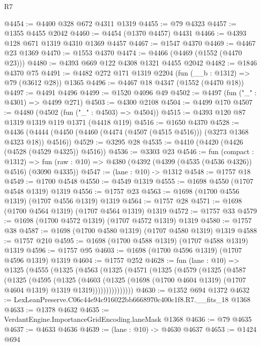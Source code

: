 \begin{lexlean}{R7}
\begin{coremodule}
@4454 := @4400 @328 @672 @4311 @1319
@4455 := @79 @4323
@4457 := @1355 @4455 @2042
@4460 := @4454 (@1370 @4457) @4431
@4466 := @4393 @128 @671 @1319 @4310 @1369 @4457
@4467 := @1547 @4370
@4469 := @4467 @23 @1369
@4470 := @1553 @4370
@4474 := @4466 (@4469 (@1552 (@4470 @23)))
@4480 := @4393 @669 @122 @4308 @1321 @4455 @2042
@4482 := @1846 @4370 @75
@4491 := @4482 @272 @171 @1319 @2204 (fun (__b : @1312) => @79 (@3612 @28)) @1365
@4496 := @4467 @18 @4347 (@1552 (@4470 @18))
@4497 := @4491 @4496
@4499 := @1520 @4096 @49
@4502 := @4497 (fun ("_" : @4301) => @4499 @271)
@4503 := @4300 @2108
@4504 := @4499 @170
@4507 := @4480 (@4502 (fun ("_" : @4503) => @4504))
@4515 := @4393 @120 @87 @1319 @1319 @119 @1371 (@4418 @119)
@4516 := @1650 @4370
@4528 := @4436 (@4444 (@4450 (@4460 (@4474 (@4507 (@4515 @4516))) (@3273 @1368 @4323 @18)) @4516))
@4529 := @3295 @28
@4535 := @4410 (@4420 (@4426 (@4528 (@4529 @4325)) @4516))
@4536 := @3303 @23
@4546 := fun (compact : @1312) =>
  fun (raw : @10) => @4380 (@4392 (@4399 (@4535 (@4536 @4326)) @4516) (@3090 @4335))
@4547 := (lane : @10) -> @1312
@4548 := @1757 @18
@4549 := @1700 @4548
@4550 := @4549 @1319
@4555 := @1698 @4550 (@1707 @4548 @1319) @1319
@4556 := @1757 @23
@4563 := @1698 (@1700 @4556 @1319) (@1707 @4556 @1319) @1319
@4564 := @1757 @28
@4571 := @1698 (@1700 @4564 @1319) (@1707 @4564 @1319) @1319
@4572 := @1757 @33
@4579 := @1698 (@1700 @4572 @1319) (@1707 @4572 @1319) @1319
@4580 := @1757 @38
@4587 := @1698 (@1700 @4580 @1319) (@1707 @4580 @1319) @1319
@4588 := @1757 @210
@4595 := @1698 (@1700 @4588 @1319) (@1707 @4588 @1319) @1319
@4596 := @1757 @95
@4603 := @1698 (@1700 @4596 @1319) (@1707 @4596 @1319) @1319
@4604 := @1757 @252
@4628 := fun (lane : @10) =>
  @1325
    (@4555
      (@1325
        (@4563
          (@1325
            (@4571
              (@1325
                (@4579
                  (@1325
                    (@4587
                      (@1325
                        (@4595
                          (@1325
                            (@4603
                              (@1325
                                (@1698
                                  (@1700 @4604 @1319)
                                  (@1707 @4604 @1319)
                                  @1319
                                  @1319)))))))))))))))
@4630 := @1352 @694 @1372
@4632 := LexLeanPreserve.C06c44e94c916022bb6668970c400c1f8.R7.__fits_18 @1368
@4633 := @1378 @4632
@4635 := VerdantEngine.ImportanceGridEncoding.laneMask @1368
@4636 := @79 @4635
@4637 := @4633 @4636
@4639 := (lane : @10) -> @4630 @4637
@4653 := @1424
    @694

\end{coremodule}
\end{lexlean}
